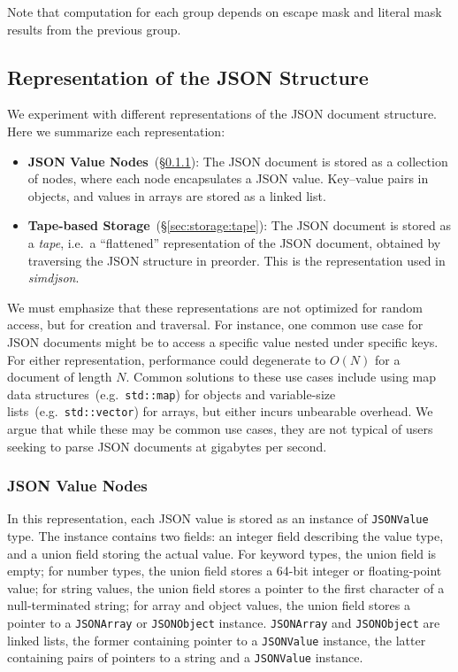 \documentclass[11pt]{article}
\begin{document}
Note that computation for each group depends on escape mask and literal mask results from the previous group.


\subsection{Representation of the JSON Structure}
We experiment with different representations of the JSON document structure. Here we summarize each representation:
\begin{itemize}
  \item \textbf{JSON Value Nodes}~(\S\ref{sec:storage:nodes}): The JSON document is stored as a collection of nodes, where each node encapsulates a JSON value. Key--value pairs in objects, and values in arrays are stored as a linked list.
  \item \textbf{Tape-based Storage}~(\S\ref{sec:storage:tape}): The JSON document is stored as a \textit{tape}, i.e.\ a ``flattened'' representation of the JSON document, obtained by traversing the JSON structure in preorder. This is the representation used in \textit{simdjson}.
\end{itemize}

We must emphasize that these representations are not optimized for random access, but for creation and traversal. For instance, one common use case for JSON documents might be to access a specific value nested under specific keys. For either representation, performance could degenerate to $O(N)$ for a document of length $N$. Common solutions to these use cases include using map data structures~(e.g.\ \verb|std::map|) for objects and variable-size lists~(e.g.\ \verb|std::vector|) for arrays, but either incurs unbearable overhead. We argue that while these may be common use cases, they are not typical of users seeking to parse JSON documents at gigabytes per second.

\subsubsection{JSON Value Nodes}
\label{sec:storage:nodes}

In this representation, each JSON value is stored as an instance of \texttt{JSONValue} type. The instance contains two fields: an integer field describing the value type, and a union field storing the actual value. For keyword types, the union field is empty; for number types, the union field stores a 64-bit integer or floating-point value; for string values, the union field stores a pointer to the first character of a null-terminated string; for array and object values, the union field stores a pointer to a \texttt{JSONArray} or \texttt{JSONObject} instance. \texttt{JSONArray} and \texttt{JSONObject} are linked lists, the former containing pointer to a \texttt{JSONValue} instance, the latter containing pairs of pointers to a string and a \texttt{JSONValue} instance.
\end{document}
